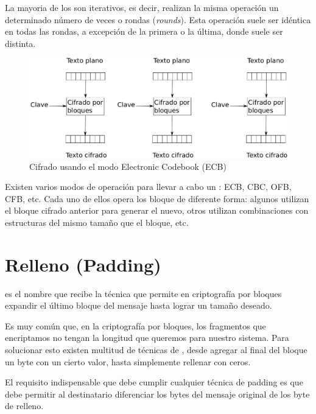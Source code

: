  La mayoria de los  son iterativos, es decir, realizan la misma operación un determinado número de veces o rondas (\emph{rounds}).
 Esta operación suele ser idéntica en todas las rondas, a excepción de la primera o la última, donde suele ser distinta.

 \begin{figure}[ht]
   \centering
   \includegraphics[scale=0.5]{Figures/ECB}
   \decoRule
   \caption[Electronic Codebook (ECB)]{Cifrado usando el modo Electronic Codebook (ECB)}
   \label{fig:ECB}
 \end{figure}

 Existen varios modos de operación para llevar a cabo un : ECB, CBC, OFB, CFB, etc.
 Cada uno de ellos opera los bloque de diferente forma: algunos utilizan el bloque cifrado anterior para generar el nuevo,
 otros utilizan combinaciones con estructuras del mismo tamaño que el bloque, etc. \emph{\parencite{Reference21}}


 \section{Relleno (Padding)}

  es el nombre que recibe la técnica que permite en criptografía por bloques expandir el último bloque del mensaje hasta lograr un tamaño deseado.

 Es muy común que, en la criptografía por bloques, los fragmentos que encriptamos no tengan la longitud que queremos para nuestro sistema.
 Para solucionar esto existen multitud de técnicas de , desde agregar al final del bloque un byte con un cierto valor, hasta simplemente rellenar con ceros.

 El requisito indispensable que debe cumplir cualquier técnica de padding es que debe permitir al destinatario diferenciar los bytes del mensaje original de los byte de relleno. \emph{\parencite{Reference8}}

